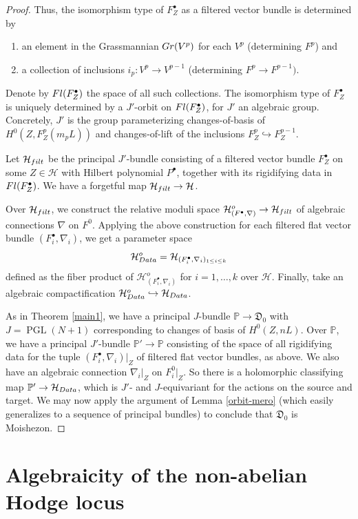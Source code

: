 \documentclass[10pt,letterpaper,english,reqno]{amsart}
\numberwithin{equation}{subsection}
\newcommand\cH{{\mathcal H}}
\newcommand\fD{{\mathfrak D}}
\newcommand\bP{{\mathbb P}}
\DeclareMathOperator{\PGL}{PGL}
\newcommand\into{\hookrightarrow}
\theoremstyle{definition}
\begin{document}
\begin{proof}
Thus, the isomorphism type of $F^\bullet_Z$
as a filtered vector bundle is determined
by
\begin{enumerate}
    \item an element in the Grassmannian
    ${\rm Gr}(V^p)$ for each $V^p$ 
    (determining $F^p$) and
    \item a collection of inclusions 
    $i_p\colon V^p\to V^{p-1}$ (determining
    $F^p\to F^{p-1})$.
\end{enumerate}
Denote by ${\rm Fl}(F^\bullet_Z)$ 
the space of all such collections. The isomorphism type of $F^\bullet_Z$ 
is uniquely determined by a
$J'$-orbit on ${\rm Fl}(F^\bullet_Z)$,
for $J'$ an algebraic group.
Concretely, $J'$ is the 
group parameterizing changes-of-basis
of $H^0(Z,F^p_Z(m_pL))$ and
changes-of-lift of the 
inclusions $F_Z^p\into F_Z^{p-1}$.

Let $\cH_{\rm filt}$ be the principal
$J'$-bundle consisting of a filtered
vector bundle $F^\bullet_Z$ on some $Z\in \cH$ with
Hilbert polynomial $P^\bullet$,
together with its rigidifying data in
${\rm Fl}(F^\bullet_Z)$. We have a forgetful
map $\cH_{\rm filt}\to \cH$.

Over $\cH_{\rm filt}$, we construct
the relative moduli space
$\cH_{(F^\bullet, \nabla)}^o\to \cH_{\rm filt}$
of algebraic connections $\nabla$ on $F^0$. Applying the above construction
for each filtered flat vector bundle 
$(F_i^\bullet,
\nabla_i)$,
we get a parameter space 
$$\cH^o_{\rm Data} = 
\cH_{(F^\bullet_i, \nabla_i)_{1\leq i \leq k}}$$
defined as the fiber product of $\cH^o_{(F_i^\bullet, \nabla_i)}$ for $i=1,\dots,k$ over $\cH$.
Finally, take an algebraic 
compactification $\cH_{\rm Data}^o\into \cH_{\rm Data}$.

As in Theorem \ref{main1}, we have a principal $J$-bundle
$\bP\to \fD_0$ with $J=\PGL(N+1)$ corresponding to changes of
basis of $H^0(Z,nL)$. Over $\bP$, 
we have a principal
$J'$-bundle $\bP'\to \bP$ 
consisting of the space of all 
rigidifying data for the tuple
$(F^\bullet_i, \nabla_i)\vert_Z$ of filtered
flat vector bundles, as above.
We also have an algebraic connection $\nabla_i\vert_Z$
on $F^0_i\vert_Z$. 
So there is a holomorphic classifying map
$\bP'\to \cH_{\rm Data}$, which is
$J'$- and $J$-equivariant for the actions
on the source and target. We may
now apply the argument of Lemma \ref{orbit-mero}
(which easily generalizes to a sequence
of principal bundles)
to conclude that $\fD_0$ is Moishezon.
\end{proof}

\section{Algebraicity of the non-abelian
Hodge locus}
\end{document}
